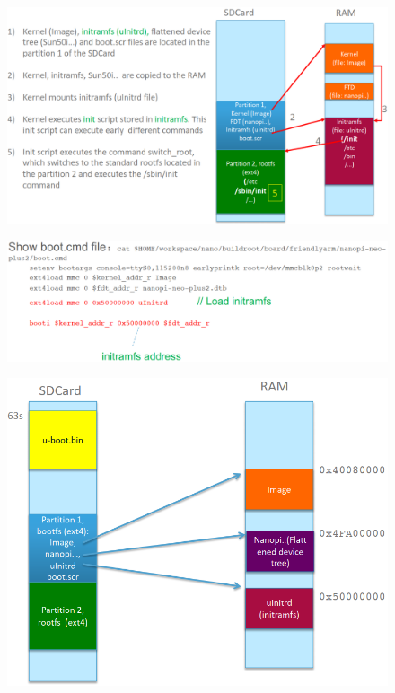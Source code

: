 \documentclass[resume]{subfiles}
\begin{document}
\begin{figure}[H]
    \centering
    \includegraphics[width=1\columnwidth]{Figures/fileSystem/initRamFsBootSeq2.png}
    \label{fig:initRamFsBootSeq2}
\end{figure}

\begin{figure}[H]
    \centering
    \includegraphics[width=1\columnwidth]{Figures/fileSystem/initRamFsBootSeq3.png}
    \label{fig:initRamFsBootSeq3}
\end{figure}

\begin{figure}[H]
    \centering
    \includegraphics[width=1\columnwidth]{Figures/fileSystem/initRamFsBootSeq4.png}
    \label{fig:initRamFsBootSeq4}
\end{figure}
\end{document}
